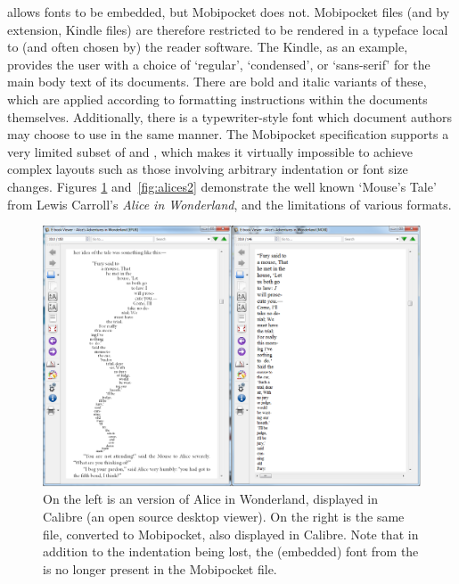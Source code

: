 \epub{} allows fonts to be embedded, but Mobipocket does not. Mobipocket files (and by extension, Kindle files) are therefore restricted to be rendered in a typeface local to (and often chosen by) the reader software. The Kindle, as an example, provides the user with a choice of `regular', `condensed', or `sans-serif' for the main body text of its documents. There are bold and italic variants of these, which are applied according to formatting instructions within the documents themselves. Additionally, there is a typewriter-style font which document authors may choose to use in the same manner. The Mobipocket specification supports a very limited subset of \html{} and \css{}, which makes it virtually impossible to achieve complex layouts such as those involving arbitrary indentation or font size changes. Figures \ref{fig:alices1} and~\ref{fig:alices2} demonstrate the well known `Mouse's Tale' from Lewis Carroll's \emph{Alice in Wonderland}, and the limitations of various formats.


\begin{figure}[tb]
\includegraphics[width=\textwidth]{gfx/alices1}
\caption[Document displayed in Calibre]{On the left is an \epub{} version of Alice in Wonderland, displayed in Calibre (an open source desktop \ebook{} viewer). On the right is the same file, converted to Mobipocket, also displayed in Calibre. Note that in addition to the indentation being lost, the (embedded) font from the \epub{} is no longer present in the Mobipocket file.}
\label{fig:alices1}
\end{figure}


